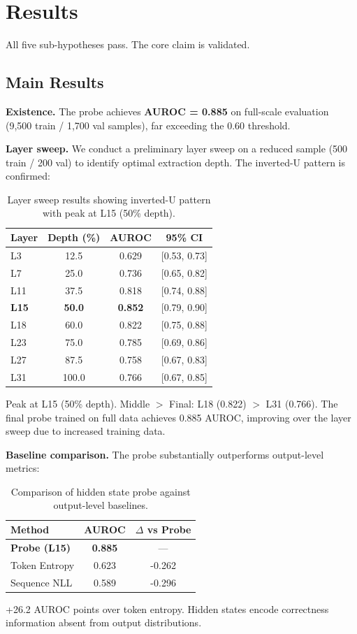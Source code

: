 \section{Results}

All five sub-hypotheses pass. The core claim is validated.

\subsection{Main Results}

\textbf{Existence.} The probe achieves \textbf{AUROC = 0.885} on full-scale evaluation (9,500 train / 1,700 val samples), far exceeding the 0.60 threshold.

\textbf{Layer sweep.} We conduct a preliminary layer sweep on a reduced sample (500 train / 200 val) to identify optimal extraction depth. The inverted-U pattern is confirmed:

\begin{table}[h]
\centering
\caption{Layer sweep results showing inverted-U pattern with peak at L15 (50\% depth).}
\label{tab:layer_sweep}
\begin{tabular}{@{}lccc@{}}
\toprule
Layer & Depth (\%) & AUROC & 95\% CI \\
\midrule
L3    & 12.5      & 0.629 & [0.53, 0.73] \\
L7    & 25.0      & 0.736 & [0.65, 0.82] \\
L11   & 37.5      & 0.818 & [0.74, 0.88] \\
\textbf{L15}   & \textbf{50.0}      & \textbf{0.852} & [0.79, 0.90] \\
L18   & 60.0      & 0.822 & [0.75, 0.88] \\
L23   & 75.0      & 0.785 & [0.69, 0.86] \\
L27   & 87.5      & 0.758 & [0.67, 0.83] \\
L31   & 100.0     & 0.766 & [0.67, 0.85] \\
\bottomrule
\end{tabular}
\end{table}

Peak at L15 (50\% depth). Middle $>$ Final: L18 (0.822) $>$ L31 (0.766). The final probe trained on full data achieves 0.885 AUROC, improving over the layer sweep due to increased training data.

\textbf{Baseline comparison.} The probe substantially outperforms output-level metrics:

\begin{table}[h]
\centering
\caption{Comparison of hidden state probe against output-level baselines.}
\label{tab:baseline_comparison}
\begin{tabular}{@{}lcc@{}}
\toprule
Method & AUROC & $\Delta$ vs Probe \\
\midrule
\textbf{Probe (L15)} & \textbf{0.885} & --- \\
Token Entropy & 0.623 & -0.262 \\
Sequence NLL & 0.589 & -0.296 \\
\bottomrule
\end{tabular}
\end{table}

+26.2 AUROC points over token entropy. Hidden states encode correctness information absent from output distributions.
